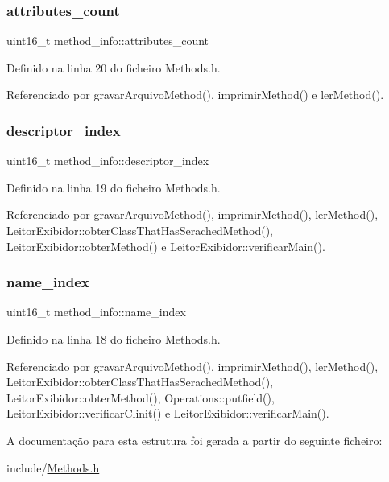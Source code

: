 \subsubsection{\texorpdfstring{attributes\+\_\+count}{attributes\_count}}
{\footnotesize\ttfamily uint16\+\_\+t method\+\_\+info\+::attributes\+\_\+count}



Definido na linha 20 do ficheiro Methods.\+h.



Referenciado por gravar\+Arquivo\+Method(), imprimir\+Method() e ler\+Method().

\mbox{\label{structmethod__info_abccd6a5202d4c0ee1be6b89692d0352a}} 
\subsubsection{\texorpdfstring{descriptor\+\_\+index}{descriptor\_index}}
{\footnotesize\ttfamily uint16\+\_\+t method\+\_\+info\+::descriptor\+\_\+index}



Definido na linha 19 do ficheiro Methods.\+h.



Referenciado por gravar\+Arquivo\+Method(), imprimir\+Method(), ler\+Method(), Leitor\+Exibidor\+::obter\+Class\+That\+Has\+Serached\+Method(), Leitor\+Exibidor\+::obter\+Method() e Leitor\+Exibidor\+::verificar\+Main().

\mbox{\label{structmethod__info_af0ba3d6d566432e74eed5c37cd998c14}} 
\subsubsection{\texorpdfstring{name\+\_\+index}{name\_index}}
{\footnotesize\ttfamily uint16\+\_\+t method\+\_\+info\+::name\+\_\+index}



Definido na linha 18 do ficheiro Methods.\+h.



Referenciado por gravar\+Arquivo\+Method(), imprimir\+Method(), ler\+Method(), Leitor\+Exibidor\+::obter\+Class\+That\+Has\+Serached\+Method(), Leitor\+Exibidor\+::obter\+Method(), Operations\+::putfield(), Leitor\+Exibidor\+::verificar\+Clinit() e Leitor\+Exibidor\+::verificar\+Main().



A documentação para esta estrutura foi gerada a partir do seguinte ficheiro\+:\begin{DoxyCompactItemize}
\item 
include/\hyperlink{Methods_8h}{Methods.\+h}\end{DoxyCompactItemize}
